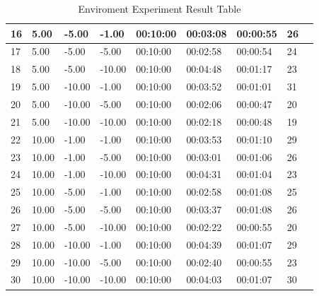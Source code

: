 \begin{table}[]
{\begin{tabular}{|l|l|l|l|l|l|l|l|l|}
16         & 5.00    & -5.00      & -1.00   & 00:10:00 & 00:03:08     & 00:00:55      & 26         \\ \hline
17         & 5.00    & -5.00      & -5.00   & 00:10:00 & 00:02:58     & 00:00:54      & 24         \\ \hline
18         & 5.00    & -5.00      & -10.00  & 00:10:00 & 00:04:48     & 00:01:17      & 23         \\ \hline
19         & 5.00    & -10.00     & -1.00   & 00:10:00 & 00:03:52     & 00:01:01      & 31         \\ \hline
20         & 5.00    & -10.00     & -5.00   & 00:10:00 & 00:02:06     & 00:00:47      & 20         \\ \hline
21         & 5.00    & -10.00     & -10.00  & 00:10:00 & 00:02:18     & 00:00:48      & 19         \\ \hline
22         & 10.00   & -1.00      & -1.00   & 00:10:00 & 00:03:53     & 00:01:10      & 29         \\ \hline
23         & 10.00   & -1.00      & -5.00   & 00:10:00 & 00:03:01     & 00:01:06      & 26         \\ \hline
24         & 10.00   & -1.00      & -10.00  & 00:10:00 & 00:04:31     & 00:01:04      & 23         \\ \hline
25         & 10.00   & -5.00      & -1.00   & 00:10:00 & 00:02:58     & 00:01:08      & 25         \\ \hline
26         & 10.00   & -5.00      & -5.00   & 00:10:00 & 00:03:37     & 00:01:08      & 26         \\ \hline
27         & 10.00   & -5.00      & -10.00  & 00:10:00 & 00:02:22     & 00:00:55      & 20         \\ \hline
28         & 10.00   & -10.00     & -1.00   & 00:10:00 & 00:04:39     & 00:01:07      & 29         \\ \hline
29         & 10.00   & -10.00     & -5.00   & 00:10:00 & 00:02:40     & 00:00:55      & 23         \\ \hline
30         & 10.00   & -10.00     & -10.00  & 00:10:00 & 00:04:03     & 00:01:07      & 30         \\ \hline
\end{tabular}}
\caption{Enviroment Experiment Result Table}
\label{tab:enviroment_experiment_result}
\end{table}
